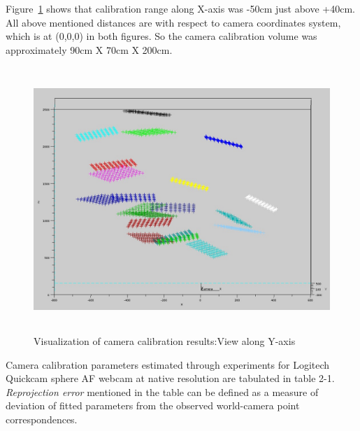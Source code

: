 \noindent  
Figure~\ref{fig:cam_calib_plot_2} shows that calibration range along X-axis  
was -50cm just above +40cm. All above mentioned distances are with respect to  
camera coordinates system, which is at (0,0,0) in both figures. So the camera  
calibration volume was approximately 90cm X 70cm X 200cm.  
\begin{figure}[htbp]  
\centering  
\includegraphics[width=15cm,height=10cm]{../img_source/cam_calib_view2.jpg}  
\caption{Visualization of camera calibration results:View along Y-axis} 
\label{fig:cam_calib_plot_2} 
\end{figure}  
Camera calibration parameters estimated through experiments for Logitech Quickcam sphere AF webcam at native resolution are tabulated in table 2-1. \textit{Reprojection error} mentioned in the table can be defined as a measure of deviation of fitted parameters from the observed world-camera point correspondences.%
